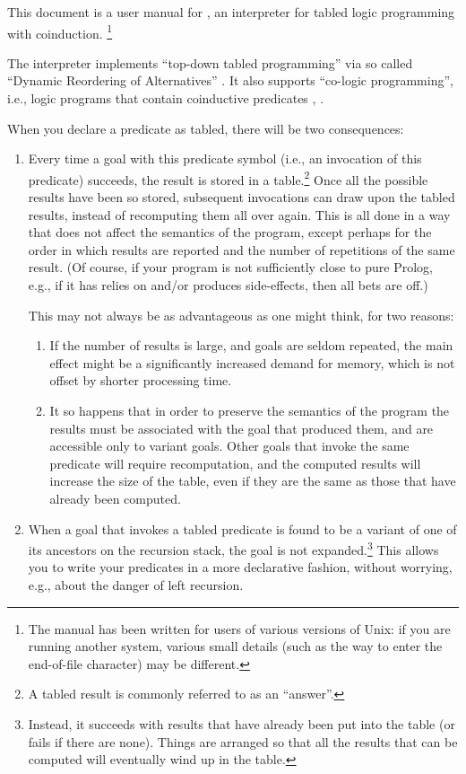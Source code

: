 
This document is a user manual for , an interpreter for tabled
logic programming with coinduction.%
\footnote{
  The manual has been written for users of various versions of Unix: if you
  are running another system, various small details (such as the way to enter
  the end-of-file character) may be different.}

The interpreter implements ``top-down tabled programming'' via so called
``Dynamic Reordering of Alternatives'' \cite{guo-gupta-dra}.  It also
supports ``co-logic programming'', i.e., logic programs that contain
coinductive predicates \cite{coinductive}, \cite{co-LP}.

\Breakup

When you declare a predicate as tabled, there will be
two consequences:
\begin{enumerate}

\item Every time a goal with this predicate symbol (i.e., an invocation of
  this predicate) succeeds, the result is stored in a table.\footnote{
    A tabled result is commonly referred to as an ``answer''.}
  Once all the possible results have been so stored, subsequent invocations
  can draw upon the tabled results, instead of recomputing them all over
  again. This is all done in a way that does not affect the semantics of the
  program, except perhaps for the order in which results are reported and the
  number of repetitions of the same result. (Of course, if your program is
  not sufficiently close to pure Prolog, e.g., if it has relies on and/or
  produces side-effects, then all bets are off.)

  This may not always be as advantageous as one might think, for two reasons:
  \begin{enumerate}
  \item If the number of results is large, and goals are seldom repeated, the
    main effect might be a significantly increased demand for memory, which
    is not offset by shorter processing time.

  \item It so happens that in order to preserve the semantics of the program
    the results must be associated with the goal that produced them, and are
    accessible only to variant goals.  Other goals that invoke the same
    predicate will require recomputation, and the computed results will
    increase the size of the table, even if they are the same as those that
    have already been computed.
  \end{enumerate}

\item When a goal that invokes a tabled predicate is found to be a variant of
  one of its ancestors on the recursion stack, the goal is not
  expanded.\footnote{
    Instead, it succeeds with results that have already been put into the
    table (or fails if there are none).  Things are arranged so that all the
    results that can be computed will eventually wind up in the table.}
  This allows you to write your predicates in a more declarative fashion,
  without worrying, e.g., about the danger of left recursion.
\end{enumerate}
